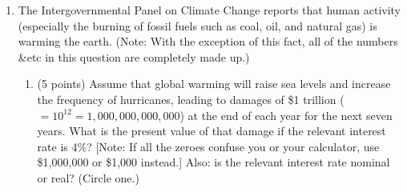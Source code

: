 \documentclass{article}
\begin{document}
\begin{enumerate}
\begin{enumerate}
\begin{KEY}
Game tree here.
\end{KEY}


    \item \begin{EXAM} (5 points) Identify (with a star on the game tree, or in words if you couldn't draw a game tree) the predicted outcome of this game. Then circle \emph{all} of the Pareto efficient outcomes in the following list, and identify a Pareto improvement for any outcome that is not Pareto efficient: $(3,1), (2,2), (1,3), (1.5,1.5)$. \clearpage \end{EXAM}

\begin{KEY}
It is Pareto efficient. You can't make Child \#2 better off without making Child \#1 worse off.
\end{KEY}
    \end{enumerate}



















\item \begin{EXAM} The Intergovernmental Panel on Climate Change reports that human activity (especially the burning of fossil fuels such as coal, oil, and natural gas) is warming the earth. (Note: With the exception of this fact, all of the numbers \&etc in this question are completely made up.) \end{EXAM}

    \begin{enumerate}

    \item \begin{EXAM} (5 points) Assume that global warming will raise sea levels and increase the frequency of hurricanes, leading to damages of \$1 trillion ($=10^{12}=1,000,000,000,000$) at the end of each year for the next seven years. What is the present value of that damage if the relevant interest rate is 4\%? [Note: If all the zeroes confuse you or your calculator, use \$1,000,000 or \$1,000 instead.] Also: is the relevant interest rate nominal or real? (Circle one.) \label{gw1} \vspace{1.5in}\end{EXAM}


\end{enumerate}
\end{enumerate}
\end{document}
